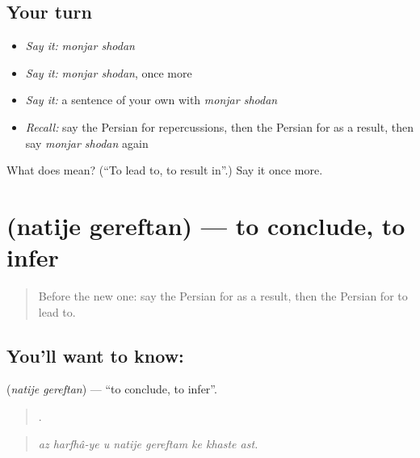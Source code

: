 \subsection*{Your turn}
\begin{itemize}
\raggedright
  \item \emph{Say it:} \emph{monjar shodan}
  \item \emph{Say it:} \emph{monjar shodan}, once more
  \item \emph{Say it:} a sentence of your own with \emph{monjar shodan}
  \item \emph{Recall:} say the Persian for repercussions, then the Persian for as a result, then say \emph{monjar shodan} again
\end{itemize}

\begin{tcolorbox}[breakable,colback=teal!4,colframe=teal!35!black,title={Before you move on}]
What does   mean? (\textquotedblleft{}To lead to, to result in\textquotedblright{}.) Say it once more.
\end{tcolorbox}
\section[\texorpdfstring{\fa{نتیجه} \fa{گرفتن} (natije gereftan)}{نتیجه گرفتن (natije gereftan)}]{  (natije gereftan) — to conclude, to infer}

\label{lesson:FA-C370-natije-gereftan}



\begin{quote}
Before the new one: say the Persian for as a result, then the Persian for to lead to.
\end{quote}

\subsection*{You'll want to know:  }
\textbf{ } (\emph{natije gereftan}) — \textquotedblleft{}to conclude, to infer\textquotedblright{}.

\begin{quote}
       .
\end{quote}

\begin{quote}
\emph{az harfhâ-ye u natije gereftam ke khaste ast.}
\end{quote}

